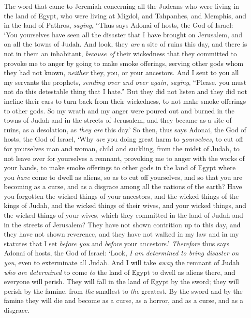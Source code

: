 \begin{biblechapter} %
 The word that came to Jeremiah concerning all the Judeans who were living in the land of Egypt, who were living at Migdol, and Tahpanhes, and Memphis, and in the land of Pathros, \textit{saying},
\verse “Thus says Adonai of hosts, the God of Israel: ‘You yourselves have seen all the disaster that I have brought on Jerusalem, and on all the towns of Judah. And look, they \textit{are} a site of ruins this day, and there is not in them an inhabitant,
\verse \textit{because of} their wickedness that they committed to provoke me to anger by going to make smoke offerings, serving other gods whom they had not known, \textit{neither} they, you, or your ancestors.
\verse And I sent to you all my servants the prophets, \textit{sending over and over again}, \textit{saying}, “Please, you must not do this detestable thing that I hate.”
\verse But they did not listen and they did not incline their ears to turn back from their wickedness, to not make smoke offerings to other gods.
\verse So my wrath and my anger were poured out and burned in the towns of Judah and in the streets of Jerusalem, and they became as a site of ruins, as a desolation, as \textit{they are} this day.’
\verse So then, thus says Adonai, the God of hosts, the God of Israel, ‘Why \textit{are} you doing great harm to \textit{yourselves}, to cut off for yourselves man and woman, child and suckling, from the midst of Judah, to not leave over for yourselves a remnant,
\verse provoking me to anger with the works of your hands, to make smoke offerings to other gods in the land of Egypt where you \textit{have} come to dwell as aliens, so as to cut off yourselves, and so that you are becoming as a curse, and as a disgrace among all the nations of the earth?
\verse Have you forgotten the wicked things of your ancestors, and the wicked things of the kings of Judah, and the wicked things of their wives, and your wicked things, and the wicked things of your wives, which they committed in the land of Judah and in the streets of Jerusalem?
\verse They have not shown contrition up to this day, and they have not shown reverence, and they have not walked in my law and in my statutes that I set \textit{before you} and \textit{before} your ancestors.’
\verse \textit{Therefore} thus says Adonai of hosts, the God of Israel: ‘Look, \textit{I am determined to bring disaster on you}, even to exterminate all Judah.
\verse And I will take \textit{away} the remnant of Judah \textit{who are determined} to come \textit{to} the land of Egypt to dwell as aliens there, and everyone will perish. They will fall in the land of Egypt by the sword; they will perish by the famine, from \textit{the} smallest to \textit{the} greatest. By the sword and by the famine they will die and become as a curse, as a horror, and as a curse, and as a disgrace.

\end{biblechapter}
